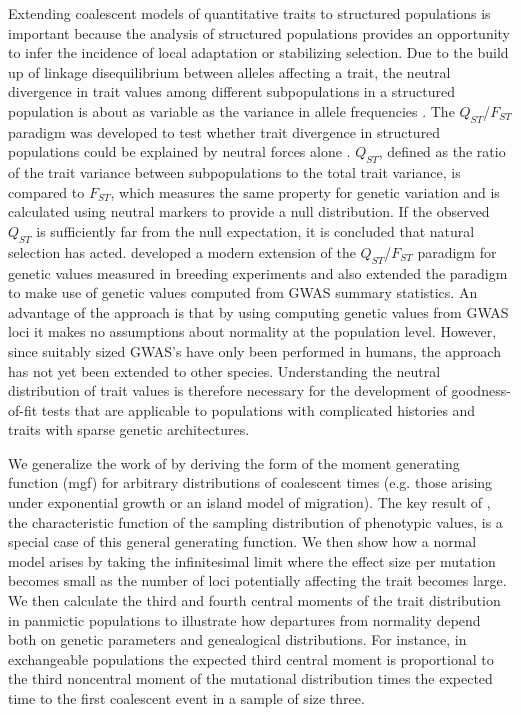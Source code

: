 Extending coalescent models of quantitative traits to structured populations is
important because the analysis of structured populations provides an opportunity
to infer the incidence of local adaptation or stabilizing selection. Due to the
build up of linkage disequilibrium between alleles affecting a trait, the
neutral divergence in trait values among different subpopulations in a
structured population is about as variable as the variance in allele
frequencies \citep{Rogers1983}. The $Q_{ST}$/$F_{ST}$ paradigm was developed to
test whether trait divergence in structured populations could be explained by
neutral forces alone \citep{Spitze1993,Whitlock2008,Leinonen2013}. $Q_{ST}$,
defined as the ratio of the trait variance between subpopulations to the total
trait variance, is compared to $F_{ST}$, which measures the same property for
genetic variation and is calculated using neutral markers to provide a null
distribution. If the observed $Q_{ST}$ is sufficiently far from the null
expectation, it is concluded that natural selection has
acted. \citet{Ovaskainen2011} developed a modern extension of the
$Q_{ST}$/$F_{ST}$ paradigm for genetic values measured in breeding experiments
and \citet{Berg2014} also extended the paradigm to make use of genetic values
computed from GWAS summary statistics. An advantage of the
\citet{Berg2014} approach is that by using computing genetic values from GWAS
loci it makes no assumptions about normality at the population level. However,
since suitably sized GWAS's have only been performed in humans, the approach has
not yet been extended to other species. Understanding the neutral distribution
of trait values is therefore necessary for the development of goodness-of-fit
tests that are applicable to populations with complicated histories and traits
with sparse genetic architectures.

We generalize the work of \citet{Schraiber2015} by deriving the form of the
moment generating function (mgf) for arbitrary distributions of coalescent times
(e.g. those arising under exponential growth or an island model of migration).
The key result of \citet{Schraiber2015}, the characteristic function of the
sampling distribution of phenotypic values, is a special case of this general
generating function. We then show how a normal model arises by taking the
infinitesimal limit where the effect size per mutation becomes small as the
number of loci potentially affecting the trait becomes large. We then calculate
the third and fourth central moments of the trait distribution in panmictic
populations to illustrate how departures from normality depend both on genetic
parameters and genealogical distributions. For instance, in exchangeable
populations the expected third central moment is proportional to the third
noncentral moment of the mutational distribution times the expected time to the
first coalescent event in a sample of size three.

